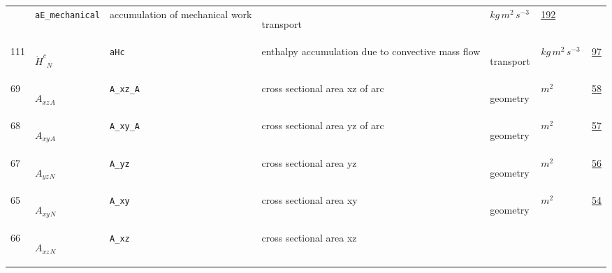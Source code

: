 \begin{longtable}{|p{1cm}|p{2.5cm}|p{4.5cm}|p{8cm}|p{3.0cm}|p{3cm}|p{1cm}|}
             & \verb|aE_mechanical|
             & accumulation of mechanical work
             & \begin{lay}transport \end{lay}
             & $ kg \,m^{2} \,s^{-3} \, $
             &                 \hyperlink{"e:192"}{ 192 }
                 \\
            111
             & \hypertarget{"v:111"}{ $ {{\dot{H}^c}}{_{N}} $}
             & \verb|aHc|
             & enthalpy accumulation due to convective mass flow
             & \begin{lay}transport \end{lay}
             & $ kg \,m^{2} \,s^{-3} \, $
             &                 \hyperlink{"e:97"}{ 97 }
                 \\
            69
             & \hypertarget{"v:69"}{ $ {{A_{xz}}}{_{A}} $}
             & \verb|A_xz_A|
             & cross sectional area xz of arc
             & \begin{lay}geometry \end{lay}
             & $ m^{2} \, $
             &                 \hyperlink{"e:58"}{ 58 }
                 \\
            68
             & \hypertarget{"v:68"}{ $ {{A_{xy}}}{_{A}} $}
             & \verb|A_xy_A|
             & cross sectional area yz of arc
             & \begin{lay}geometry \end{lay}
             & $ m^{2} \, $
             &                 \hyperlink{"e:57"}{ 57 }
                 \\
            67
             & \hypertarget{"v:67"}{ $ {{A_{yz}}}{_{N}} $}
             & \verb|A_yz|
             & cross sectional area yz
             & \begin{lay}geometry \end{lay}
             & $ m^{2} \, $
             &                 \hyperlink{"e:56"}{ 56 }
                 \\
            65
             & \hypertarget{"v:65"}{ $ {{A_{xy}}}{_{N}} $}
             & \verb|A_xy|
             & cross sectional area xy
             & \begin{lay}geometry \end{lay}
             & $ m^{2} \, $
             &                 \hyperlink{"e:54"}{ 54 }
                 \\
            66
             & \hypertarget{"v:66"}{ $ {{A_{xz}}}{_{N}} $}
             & \verb|A_xz|
             & cross sectional area xz

\end{longtable}

